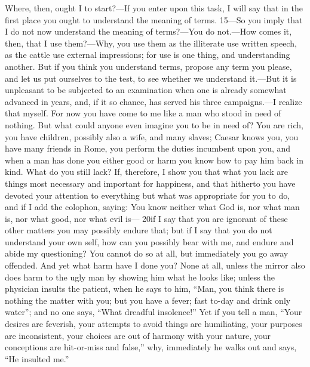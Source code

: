 Where, then, ought I to start?—If you enter upon this task, I will say that in the first place you ought to understand the meaning of terms. 15—So you imply that I do not now understand the meaning of terms?—You do not.—How comes it, then, that I use them?—Why, you use them as the illiterate use written speech, as the cattle use external impressions; for use is one thing, and understanding another. But if you think you understand terms, propose any term you please, and let us put ourselves to the test, to see whether we understand it.—But it is unpleasant to be subjected to an examination when one is already somewhat advanced in years, and, if it so chance, has served his three campaigns.—I realize that myself. For now you have come to me like a man who stood in need of nothing. But what could anyone even imagine you to be in need of? You are rich, you have children, possibly also a wife, and many slaves; Caesar knows you, you have many friends in Rome, you perform the duties incumbent upon you, and when a man has done you either good or harm you know how to pay him back in kind. What do you still lack? If, therefore, I show you that what you lack are things most necessary and important for happiness, and that hitherto you have devoted your attention to everything but what was appropriate for you to do, and if I add the colophon, saying: You know neither what God is, nor what man is, nor what good, nor what evil is— 20if I say that you are ignorant of these other matters you may possibly endure that; but if I say that you do not understand your own self, how can you possibly bear with me, and endure and abide my questioning? You cannot do so at all, but immediately you go away offended. And yet what harm have I done you? None at all, unless the mirror also does harm to the ugly man by showing him what he looks like; unless the physician insults the patient, when he says to him, ``Man, you think there is nothing the matter with you; but you have a fever; fast to-day and drink only water''; and no one says, ``What dreadful insolence!'' Yet if you tell a man, ``Your desires are feverish, your attempts to avoid things are humiliating, your purposes are inconsistent, your choices are out of harmony with your nature, your conceptions are hit-or-miss and false,'' why, immediately he walks out and says, ``He insulted me.''

